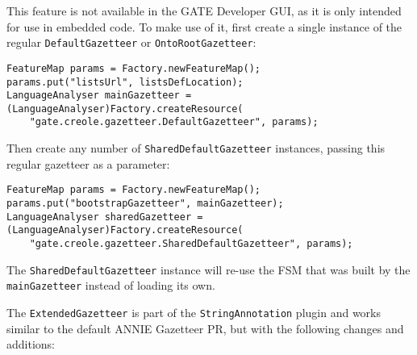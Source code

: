 This feature is not available in the GATE Developer GUI, as it is only intended
for use in embedded code.  To make use of it, first create a single instance
of the regular \texttt{DefaultGazetteer} or \texttt{OntoRootGazetteer}:
%
\begin{small}\begin{verbatim}
FeatureMap params = Factory.newFeatureMap();
params.put("listsUrl", listsDefLocation);
LanguageAnalyser mainGazetteer = (LanguageAnalyser)Factory.createResource(
    "gate.creole.gazetteer.DefaultGazetteer", params);
\end{verbatim}\end{small}

Then create any number of \texttt{SharedDefaultGazetteer} instances, passing
this regular gazetteer as a parameter:
%
\begin{small}\begin{verbatim}
FeatureMap params = Factory.newFeatureMap();
params.put("bootstrapGazetteer", mainGazetteer);
LanguageAnalyser sharedGazetteer = (LanguageAnalyser)Factory.createResource(
    "gate.creole.gazetteer.SharedDefaultGazetteer", params);
\end{verbatim}\end{small}

The \texttt{SharedDefaultGazetteer} instance will re-use the FSM that was built
by the \texttt{mainGazetteer} instead of loading its own.


The \texttt{ExtendedGazetteer} is part of the \texttt{StringAnnotation} plugin and works
similar to the default ANNIE Gazetteer PR, but with the following changes and 
additions:

